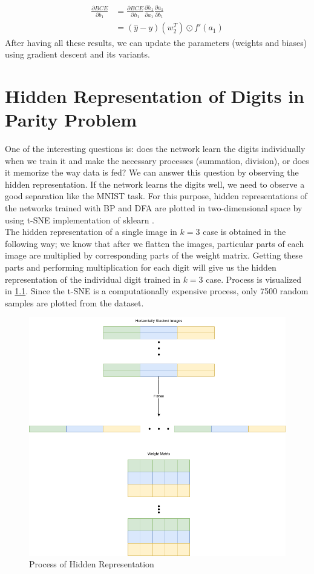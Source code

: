 \documentclass[a4paper, nobind]{templates/ociamthesis}
\begin{document}
\[
\begin{aligned} 
\frac{\partial BCE}{\partial b_{1}}&=\frac{\partial BCE}{\partial h_1} \frac{\partial h_1}{\partial a_{1}} \frac{\partial a_{1}}{\partial b_{1}} \\
&= \left(\hat{y}-y\right)\left(w_{2}^T\right) \odot f'(a_1)
\end{aligned}
\]
After having all these results, we can update the parameters (weights and biases) using gradient descent and its variants.

\hypertarget{hidden-representation-of-digits-in-parity-problem}{%
\chapter{Hidden Representation of Digits in Parity Problem}\label{hidden-representation-of-digits-in-parity-problem}}

One of the interesting questions is: does the network learn the digits individually when we train it and make the necessary processes (summation, division), or does it memorize the way data is fed? We can answer this question by observing the hidden representation. If the network learns the digits well, we need to observe a good separation like the MNIST task. For this purpose, hidden representations of the networks trained with BP and DFA are plotted in two-dimensional space by using t-SNE \cite{vanDerMaaten2008} implementation of sklearn \cite{scikit-learn}.\\
The hidden representation of a single image in \(k=3\) case is obtained in the following way; we know that after we flatten the images, particular parts of each image are multiplied by corresponding parts of the weight matrix. Getting these parts and performing multiplication for each digit will give us the hidden representation of the individual digit trained in \(k=3\) case. Process is visualized in \ref{fig:HiddenRepProcess}. Since the t-SNE is a computationally expensive process, only 7500 random samples are plotted from the dataset.

\begin{figure}

{\centering \includegraphics[width=0.6\linewidth]{figures/B_hidden_rep_process} 

}

\caption{Process of Hidden Representation}\label{fig:HiddenRepProcess}
\end{figure}
\end{document}
